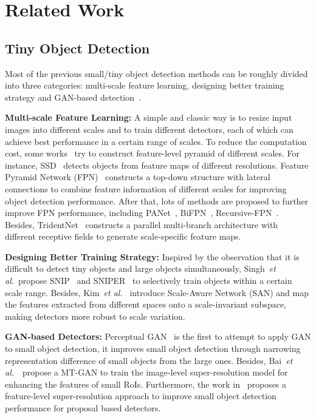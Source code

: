 \documentclass{article}
\newcommand{\etal}{\textit{et al.}}
\begin{document}
\section{Related Work}
\label{sec::related_work}

\subsection{Tiny Object Detection}

Most of the previous small/tiny object detection methods can be roughly divided into three categories: multi-scale feature learning, designing better training strategy and GAN-based detection~\cite{reviewtod_2020_icv}.

\textbf{Multi-scale Feature Learning:} A simple and classic way is to resize input images into different scales and to train different detectors, each of which can achieve best performance in a certain range of scales. To reduce the computation cost, some works~\cite{SSD_2016_ECCV, FPN_2017_CVPR, M2Det_2019_AAAI} try to construct feature-level pyramid of different scales. For instance, SSD~\cite{SSD_2016_ECCV} detects objects from feature maps of different resolutions. Feature Pyramid Network (FPN)~\cite{FPN_2017_CVPR} constructs a top-down structure with lateral connections to combine feature information of different scales for improving object detection performance. After that, lots of methods are proposed to further improve FPN performance, including PANet~\cite{PANet_2018_CVPR}, BiFPN~\cite{Efficientdet_2020_CVPR}, Recursive-FPN~\cite{DetectoRS_2020_arXiv}. Besides, TridentNet~\cite{Trident-Net_2019_ICCV} constructs a parallel multi-branch architecture with different receptive fields to generate scale-specific feature maps.

\textbf{Designing Better Training Strategy:} Inspired by the observation that it is difficult to detect tiny objects and large objects simultaneously, Singh~\etal~propose SNIP~\cite{SNIP_2018_CVPR} and SNIPER~\cite{SNIPER_2018_NIPS} to selectively train objects within a certain scale range. Besides, Kim~\etal~\cite{san_2018_eccv} introduce Scale-Aware Network (SAN) and map the features extracted from different spaces onto a scale-invariant subspace, making detectors more robust to scale variation.

\textbf{GAN-based Detectors:} Perceptual GAN~\cite{PGAN_2017_CVPR} is the first to attempt to apply GAN to small object detection, it improves small object detection through narrowing representation difference of small objects from the large ones. Besides, Bai~\etal~\cite{SOD-MTGAN_2018_ECCV}~propose a MT-GAN to train the image-level super-resolution model for enhancing the features of small RoIs. Furthermore, the work in~\cite{Better_to_Follow_2019_ICCV} proposes a feature-level super-resolution approach to improve small object detection performance for proposal based detectors.
\end{document}
